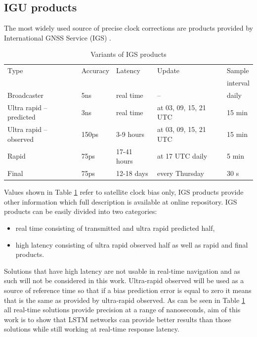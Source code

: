 \documentclass{kybernetika}
\begin{document}
\subsection{IGU products}
The most widely used source of precise clock corrections are products provided 
by International GNSS Service (IGS) \cite{Kouba2009}.
\begin{table}[htb] 
	\centering
	\caption{Variants of IGS products}
	\label{tab:igs_products}
	\begin{tabular*}{\textwidth}{*{5}{l}}
		\hline
		\hline
		Type& Accuracy& Latency& Update& Sample \\
		&&&&interval\\
		\hline
		Broadcaster & 5ns & real time & -- & daily  \\
		Ultra rapid -- predicted & 3ns & real time & at 03, 09, 15, 21 UTC & 15 min  \\
		Ultra rapid -- observed & 150ps & 3-9 hours & at 03, 09, 15, 21 UTC & 15 min  \\
		Rapid & 75ps & 17-41 hours & at 17 UTC daily & 5 min \\
		Final & 75ps & 12-18 days & every Thursday & 30 s \\
		\hline
		\hline
	\end{tabular*}
\end{table}
Values shown in Table \ref{tab:igs_products} refer to satellite clock bias only,  IGS products
provide other information which full description  is available at online repository. 
IGS products can be easily divided into two categories:
\begin{itemize}
	\item real time consisting of transmitted and ultra rapid predicted half,
	\item high latency consisting of ultra rapid observed half as well as rapid and final products.
\end{itemize}
Solutions that have high latency are not usable in real-time navigation and as such will not be
considered in this work. Ultra-rapid observed will be used as a source of
reference time so that if a bias prediction error is equal to zero it means that is
the same as provided by ultra-rapid observed.
As can be seen in Table \ref{tab:igs_products} all real-time solutions provide precision 
at a range of nanoseconds, aim of this work is to show that LSTM networks can provide 
better results than those solutions while still working at real-time response latency.

\end{document}

